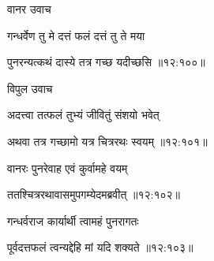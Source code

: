 {\devanagarifont वानर उवाच {\dandab}\dontdisplaylinenum  }%
 
{\devanagarifont गन्धर्वेण तु मे दत्तं फलं दत्तं तु ते मया \thinspace{\danda} \dontdisplaylinenum }%


{\devanagarifont पुनरन्यत्कथं दास्ये तत्र गच्छ यदीच्छसि {॥१२:१००॥} \veg\dontdisplaylinenum }%
 
{\devanagarifont विपुल उवाच {\dandab}\dontdisplaylinenum  }%
 
{\devanagarifont अदत्त्वा तत्फलं तुभ्यं जीवितुं संशयो भवेत् \thinspace{\danda} \dontdisplaylinenum }%


{\devanagarifont अथवा तत्र गच्छामो यत्र चित्ररथः स्वयम् {॥१२:१०१॥} \veg\dontdisplaylinenum }%

{\devanagarifont वानरः पुनरेवाह एवं कुर्वामहे वयम् \thinspace{\dandab} \dontdisplaylinenum }%


{\devanagarifont ततश्चित्ररथावासमुपगम्येदमब्रवीत् {॥१२:१०२॥} \veg\dontdisplaylinenum }%

{\devanagarifont गन्धर्वराज कार्यार्थी त्वामहं पुनरागतः \thinspace{\dandab} \dontdisplaylinenum }%


{\devanagarifont पूर्वदत्तफलं त्वन्यद्देहि मां यदि शक्यते {॥१२:१०३॥} \veg\dontdisplaylinenum  }%
 
